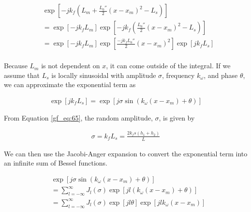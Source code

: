 \begin{equation}
\begin{aligned}
&\exp\left[-jk_f\left(L_m+\frac{L_0''}{2}(x-x_m)^2-L_s\right)\right]\\
&=\exp\left[-jk_fL_m\right]\exp\left[-jk_f\left(\frac{L_0''}{2}(x-x_m)^2-L_s\right)\right]\\
&=\exp\left[-jk_fL_m\right]\exp\left[\frac{-jk_fL_0''}{2}(x-x_m)^2\right]\exp\left[jk_fL_s \right]\\
\label{gf_eq:67a}
\end{aligned}
\end{equation}
\renewcommand{\baselinestretch}{2} \small\normalsize

Because $L_m$ is not dependent on $x$, it can come outside of the integral. If we assume that $L_s$ is locally sinusoidal with amplitude $\sigma$, frequency $k_{\omega}$, and phase $\theta$, we can approximate the exponential term as 

\begin{equation}
\begin{aligned}
\exp\left[jk_fL_s\right] =\exp\left[j\sigma \sin\left(k_{\omega} (x-x_m) + \theta\right) \right]
\end{aligned}
\label{gf_eq:68}
\end{equation}
\renewcommand{\baselinestretch}{2} \small\normalsize

\noindent From Equation \ref{gf_eq:65}, the random amplitude, $\sigma$, is given by

\begin{equation}
\begin{aligned}
\sigma = k_fL_s = \frac{2k_fs(h_1+h_2)}{L}
\end{aligned}
\label{gf_eq:69}
\end{equation}
\renewcommand{\baselinestretch}{2} \small\normalsize

We can then use the Jacobi-Anger expansion \cite{gbur_math} to convert the exponential term into an infinite sum of Bessel functions.

\begin{equation}
\begin{aligned}
& \exp\left[j\sigma \sin\left(k_{\omega} (x-x_m) + \theta\right) \right] \\ &=\sum_{l=-\infty}^{\infty}J_l(\sigma)\exp\left[jl(k_{\omega}(x-x_m) + \theta) \right] \\
&=\sum_{l=-\infty}^{\infty}J_l(\sigma)\exp\left[jl\theta\right]\exp\left[jlk_{\omega}(x-x_m)\right] 
\end{aligned}
\label{gf_eq:70}
\end{equation}
\renewcommand{\baselinestretch}{2} \small\normalsize


